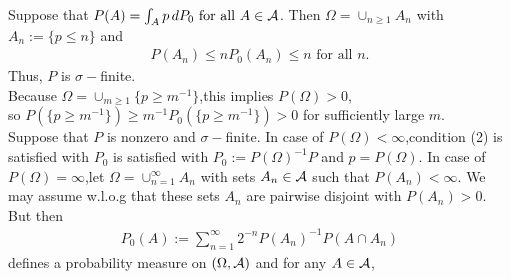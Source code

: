 \documentclass{report}
\begin{document}
{{}
\begin{myproof}
    Suppose that $P(A)=\int_Ap\,dP_0\text{ for all } A\in\mathcal A$. Then $\Omega=\cup_{n\geq 1}A_n$ with $A_n:=\{p\leq n\}$ and 
    \begin{align*}
        P(A_n)\leq nP_0(A_n)\leq n \text{ for all } n.
    \end{align*}
    Thus, $P$ is $\sigma-$finite.\\
    Because $\Omega=\cup_{m\geq 1}\{p\geq m^{-1}\}$,this implies $P(\Omega)>0$,\\
    so $P(\{p\geq m^{-1}\})\geq m^{-1}P_0(\{p\geq m^{-1}\})>0$ for sufficiently large $m$.\\
    Suppose that $P$ is nonzero and $\sigma-$finite. In case of $P(\Omega)<\infty$,condition (2) is satisfied with $P_0$ is satisfied with $P_0:=P(\Omega)^{-1}P$ and $p=P(\Omega)$. In case of $P(\Omega)=\infty$,let $\Omega=\cup_{n=1}^{\infty}A_n$ with sets $A_n\in\mathcal A$ such that $P(A_n)<\infty$. We may assume w.l.o.g that these sets $A_n$  are pairwise disjoint with $P(A_n)>0$. But then 
    \begin{align*}
        P_0(A):=\sum_{n=1}^{\infty}2^{-n}P(A_n)^{-1}P(A\cap A_n)
    \end{align*}defines a probability measure on $(\Omega,\mathcal A)$ and for any $A\in\mathcal A$,
    \begin{align*}

\end{align*}
\end{myproof}}
\end{document}
